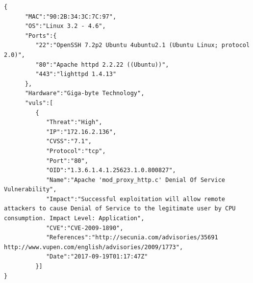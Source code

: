 \begin{lstlisting}[style=json, label=arquivo:json:output, caption={Exemplo de arquivo \gls{JSON} gerado a partir das informações.}, basicstyle=\scalefont{0.6}]
{
      "MAC":"90:2B:34:3C:7C:97",
      "OS":"Linux 3.2 - 4.6",
      "Ports":{
         "22":"OpenSSH 7.2p2 Ubuntu 4ubuntu2.1 (Ubuntu Linux; protocol 2.0)",
         "80":"Apache httpd 2.2.22 ((Ubuntu))",
         "443":"lighttpd 1.4.13"
      },
      "Hardware":"Giga-byte Technology",
      "vuls":[
         {
            "Threat":"High",
            "IP":"172.16.2.136",
            "CVSS":"7.1",
            "Protocol":"tcp",
            "Port":"80",
            "OID":"1.3.6.1.4.1.25623.1.0.800827",
            "Name":"Apache 'mod_proxy_http.c' Denial Of Service Vulnerability",
            "Impact":"Successful exploitation will allow remote attackers to cause Denial of Service to the legitimate user by CPU consumption. Impact Level: Application",
            "CVE":"CVE-2009-1890",
            "References":"http://secunia.com/advisories/35691 http://www.vupen.com/english/advisories/2009/1773",
            "Date":"2017-09-19T01:17:47Z"
         }]
}
\end{lstlisting}

